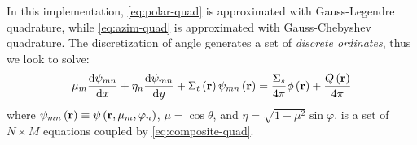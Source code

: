 \begin{frame}[allowframebreaks]
        In this implementation, \cref{eq:polar-quad} is approximated with Gauss-Legendre quadrature, while \cref{eq:azim-quad} is approximated with Gauss-Chebyshev quadrature.
        The discretization of angle generates a set of \textit{discrete ordinates}, thus we look to solve:
        \begin{equation}\label{eq:sn-equations}
                \mu_{m}\dv{\psi_{mn}}{x}+\eta_{n}\dv{\psi_{mn}}{y} + \Sigma_t \left(\mathbf{r}\right)\psi_{mn}\left(\mathbf{r}\right) =\frac{\Sigma_s}{4\pi}\phi\left(\mathbf{r}\right) + \frac{Q\left(\mathbf{r}\right)}{4\pi}
        \end{equation}
        where $\psi_{mn}\left(\mathbf{r}\right)\equiv \psi\left(\mathbf{r},\mu_m,\varphi_n\right)$, $\mu=\cos\theta$, and $\eta=\sqrt{1-\mu^2}\sin\varphi$.
         is a set of $N\times M$ equations coupled by \cref{eq:composite-quad}.
\end{frame}
